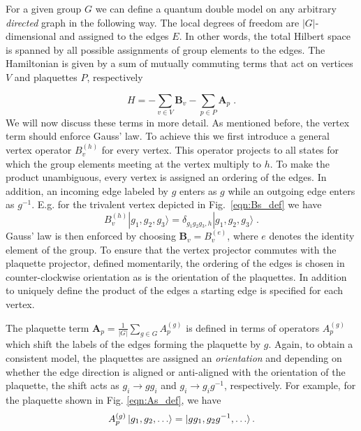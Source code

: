 \documentclass[two column]{article}
\begin{document}
For a given group $G$ we can define a quantum double model on any arbitrary \emph{directed} graph in the following way. The local degrees of freedom are $|G|$-dimensional and assigned to the edges $E$. In other words, the total Hilbert space is spanned by all possible assignments of group elements to the edges. The Hamiltonian is given by  a sum of mutually commuting terms that act on vertices $V$ and plaquettes $P$, respectively




\begin{equation}
    H = -  \sum_{v \in V} \mathbf B_v -  \sum_{p  \in  P} \mathbf A_p \label{eqn:ham} \;.
\end{equation}
We will now discuss these terms in more detail. As mentioned before, the vertex term should enforce Gauss' law. To achieve this we first introduce a general vertex operator $B_v^{(h)}$ for every vertex. This operator projects to all states for which the group elements meeting at the vertex multiply to $h$. To make the product unambiguous, every vertex is assigned an ordering of the edges. In addition, an incoming edge labeled by $g$ enters as $g$ while an outgoing edge enters as $g^{-1}$. E.g. for the trivalent vertex depicted in Fig.~\ref{eqn:Bs_def} we have 
\begin{equation}
B_v^{(h)} |g_1,g_2,g_3\rangle= \delta_{g_1 g_2 g_3,h} |g_1,g_2,g_3\rangle \;.	
\end{equation}
Gauss' law is then enforced by choosing $\mathbf B_v=B^{(e)}_v$, where $e$ denotes the identity element of the group. To ensure that the vertex projector commutes with the plaquette projector, defined momentarily, the ordering of the edges is chosen in counter-clockwise orientation as is the orientation of the plaquettes. In addition to uniquely define the product of the edges a starting edge is specified for each vertex.

The plaquette term 
	$\mathbf A_p=\frac{1}{|G|} \sum_{g \in G} A^{(g)}_p$
is defined in terms of operators $A^{(g)}_p$ which shift the labels of the edges forming the plaquette by $g$. Again, to obtain a consistent model, the plaquettes are assigned an \emph{orientation} and depending on whether the edge direction is aligned or anti-aligned with the orientation of the plaquette, the shift acts as $g_i \rightarrow gg_i$ and $g_i \rightarrow g_ig^{-1}$, respectively. For example, for the plaquette shown in Fig. \ref{eqn:As_def}, we have 
\begin{equation}
	A_p^{(g)}\ket{g_1, g_2, \ldots} = \ket{gg_1, g_2g^{-1}, \ldots}.
\end{equation} 
\end{document}
